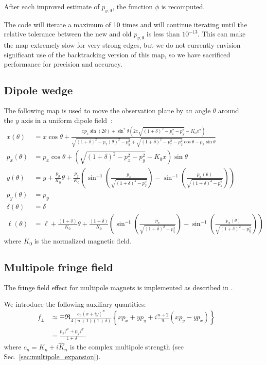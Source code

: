 After each improved estimate of $p_{y,0}$, the function $\phi$ is recomputed.

The code will iterate a maximum of 10 times and will continue iterating until the
relative tolerance between the new and old $p_{y,0}$ is less than $10^{-13}$. This
can make the map extremely slow for very strong edges, but we do not currently envision
significant use of the backtracking version of this map, so we have sacrificed performance
for precision and accuracy.


\subsection{Dipole wedge} \label{sec:DipoleWedge}

The following map is used to move the observation plane by an angle $\theta$
around the $y$ axis in a uniform dipole field~\cite{forest99}:
\begin{align}
x(\theta) &= x \cos\theta
+ \frac{ x p_x \sin(2\theta) + \sin^2\theta \left( 2x \sqrt{(1+\delta)^2 - p_x^2 - p_y^2} - K_0 x^2 \right) }
{\sqrt{(1+\delta)^2 - p_x(\theta)^2 - p_y^2} + \sqrt{(1+\delta)^2 - p_x^2 - p_y^2} \cos\theta - p_x \sin\theta}
\\[1ex]
p_x(\theta) &= p_x \cos\theta + \left( \sqrt{(1+\delta)^2 - p_x^2 - p_y^2} - K_0 x \right) \sin\theta
\\[1ex]
y(\theta) &= y + \frac{p_y}{K_0} \theta
+ \frac{p_y}{K_0} \left(
\sin^{-1}\!\left( \frac{p_x}{\sqrt{(1+\delta)^2 - p_y^2}} \right)
- \sin^{-1}\!\left( \frac{p_x(\theta)}{\sqrt{(1+\delta)^2 - p_y^2}} \right)
\right)
\\[1ex]
p_y(\theta) &= p_y
\\[1ex]
\delta(\theta) &= \delta
\\[1ex]
\ell(\theta) &= \ell + \frac{(1+\delta)}{K_0} \theta
+ \frac{(1+\delta)}{K_0} \left(
\sin^{-1}\!\left( \frac{p_x}{\sqrt{(1+\delta)^2 - p_y^2}} \right)
- \sin^{-1}\!\left( \frac{p_x(\theta)}{\sqrt{(1+\delta)^2 - p_y^2}} \right)
\right)
\end{align}
%
where $K_0$ is the normalized magnetic field.

\subsection{Multipole fringe field}

The fringe field effect for multipole magnets is implemented as described in
\cite{forest99}.

We introduce the following auxiliary quantities:
\begin{align}
f_\pm &\approx
\mp \Re \frac{c_n (x + i y)^n}{4 (n+1)(1+\delta)}
\left\{ x p_x + y p_y + i \frac{n+2}{n} (x p_y - y p_x) \right\}
\label{eq:fpm}
\\[1ex]
&= \frac{p_x f^x + p_y f^y}{1+\delta}.
\nonumber
\end{align}
where $c_n = K_n + i \hat{K}_n$ is the complex multipole strength (see Sec.~\ref{sec:multipole_expansion}).

